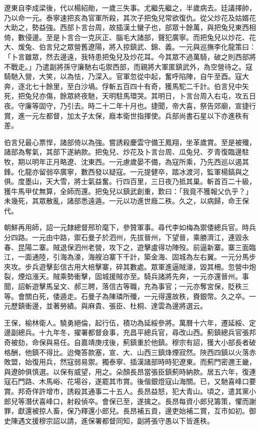 \begin{pinyinscope}
遼東自李成梁後，代以楊紹勛，一歲三失事。尤繼先繼之，半歲病去。廷議擇帥，乃以命一元。泰寧速把亥為官軍所殺，其次子把兔兒常欲復仇。從父炒花及姑婿花大助之，勢益強。西部卜言台周，故插漢土蠻子也，部眾十餘萬，與把兔兒東西相倚，數侵邊。至是卜言合一克灰正、腦毛大諸部，聲犯廣寧。而把兔兒以炒花、花大、煖兔、伯言兒之眾營舊遼陽，將入掠鎮武、錦、義。一元與巡撫李化龍策曰：「卜言雖眾，然去邊遠，我特患把兔兒及炒花耳。今其眾不過萬騎，破之則西部將不戰走。」乃遣副將孫守廉馳右屯禦西部，而親將大軍匿鎮武外，為空營待之。寇騎馳入營，大笑，以為怯，乃深入。官軍忽從中起，奮呼陷陣，自午至酉。寇大奔，逐北七十餘里，至白沙堝。俘斬五百四十有奇，獲馬駝二千計。伯言兒中矢死，把兔兒亦傷，餘眾終夜馳，天明駐馬環哭。其明日，卜言台周入右屯，攻五日夜。守廉等固守，乃引去。時二十二年十月也。捷聞，帝大喜，祭告郊廟，宣捷行賞，進一元左都督，加太子太保，廕本衛世指揮使。兵部尚書石星以下亦進秩有差。

伯言兒最心票悍，諸部倚以為強。嘗誘殺慶雲守備王鳳翔，坐革歲賞。至是被殲，諸部為奪氣，其部下遂納款。把兔兒、炒花及卜言台周、瓜兔兒、歹青復臨邊駐牧，期以明年正月略遼、沈東西。一元慮歲晏不備，為寇所乘，乃先西巡以遏其鋒。化龍亦留弱卒廣寧，數西發以疑寇。一元提健卒，踏冰渡河，監軍楊鎬與之俱。度墨山，天大雪，將士氣益奮。行四百里，三日夜乃抵其巢。斬首百二十級，獲牛馬甲仗無算，全師而還。把兔兒以鎮武創重，歎曰：「我竟不獲報父仇乎？」未幾死，其眾散亂，諸部悉遠遁。一元以功進世廕二秩。久之，以病歸，命王保代。

朝鮮再用師，詔一元隸總督邢玠麾下，參贊軍事。尋代李如梅為禦倭總兵官。時兵分四路。一元由中路，禦石曼子於泗州，先拔晉州，下望晉，乘勝濟江，連毀永春、昆陽二寨。賊退保泗州老營，攻下之，遊擊盧得功陣歿。前逼新寨。寨三面臨江，一面通陸，引海為濠，海艘泊寨下千計，築金海、固城為左右翼。一元分馬步夾攻。步兵遊擊彭信古用大棓擊寨，碎其數處。眾軍進逼賊濠，毀其柵。忽營中炮裂，煙焰漲天。賊乘勢衝擊，固城援賊亦至。騎兵諸將先奔，一元亦還晉州。事聞，詔斬遊擊馬呈文、郝三聘，落信古等職，充為事官；一元亦奪宮保，貶秩三等。會關白死，倭遁走。石曼子為陳璘所殲，一元得還故秩，賚銀幣。久之卒。一元歷鎮衝邊，並著勞績。與麻貴、張臣、杜桐、達雲為邊將選云。

王保，榆林衛人。驍勇絕倫，起行伍，積功為延綏參將。萬曆十六年，遷延綏、定邊副總兵。十九年冬，擢署都督僉事，充昌平總兵官，尋改山西。薊鎮總兵官張邦奇被劾，命保與易任。自嘉靖庚戌後，薊鎮重於他鎮。穆宗有詔，獲大小部長者破格酬，他鎮不得比。迨俺答款塞，宣、大、山西三鎮烽煙寂然。陜西四鎮以火落赤敗盟，始復用兵，然寇弱易禦。獨泰寧、插漢諸部時時犯遼東。而薊門密邇王畿，與遼帥俱慎選。以保有威望，用之。朵顏長昂當張臣鎮薊時納款。居五六年，復連寇石門路、木馬峪、花場谷，遂罷其市賞。後偕銀燈寇山海關。已，又馳喜峰口要賞。邦奇佯許增市，誘殺其通事二十五人。長昂益怒，犯大青山。頃之，遣其黨小郎兒等潛伏喜峰口，射殺偵卒。會保已至，遂擒之。長昂每資小郎兒籌策，懼而謝罪，獻還被掠人畜，保乃釋還小郎兒。長昂補五貢，邊吏始補二賞，互市如初。御史陳遇文援穆宗詔以請，進保署都督同知，副將張守愚以下皆進秩。


\end{pinyinscope}
